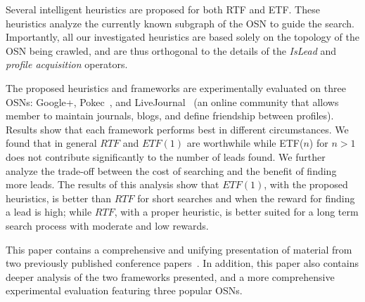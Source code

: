 \documentclass[journal]{IEEEtran}
\begin{document}
Several intelligent heuristics are proposed for both RTF and ETF. These heuristics analyze the currently known subgraph of the OSN to guide the search. Importantly, all our investigated heuristics are based solely on the topology of the OSN being crawled, and are thus orthogonal to the details of the {\em IsLead} and {\em profile acquisition} operators. 


The proposed heuristics and frameworks are experimentally evaluated on three OSNs: Google+, Pokec~\cite{takac2012data}, and LiveJournal~\cite{backstrom2006groupFormation,leskovec2009community} (an online community that allows member to maintain journals, blogs, and define friendship between profiles). Results show that each framework performs best in different circumstances. We found that in general \(RTF\) and \(ETF(1)\) are worthwhile while  ETF($n$) for $n>1$ does not contribute significantly to the number of leads found. We further analyze the trade-off between the cost of searching and the benefit of finding more leads. The results of this analysis show that \(ETF(1)\), with the proposed heuristics, is better than \(RTF\) for short searches and when the reward for finding a lead is high; while \(RTF\), with a proper heuristic, is better suited for a long term search process with moderate and low rewards. 







This paper contains a comprehensive and unifying presentation of material from two previously published conference papers~\cite{stern2013tonic,samama2014extended}. In addition, this paper also contains deeper analysis of the two frameworks presented, and a more comprehensive experimental evaluation featuring three popular OSNs. 
\end{document}
